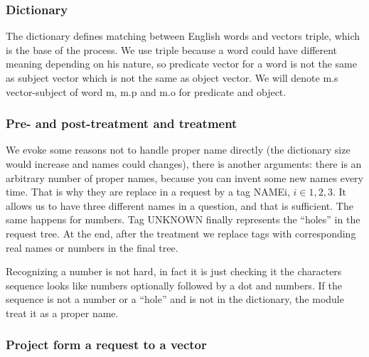 

\subsubsection{Dictionary}

The dictionary defines matching between English words and vectors triple, which is the base of the process. We use triple because a word could have different meaning depending on his nature, so predicate vector for a word is not the same as subject vector which is not the same as object vector. We will denote m.s vector-subject of word m, m.p and m.o for predicate and object.

\subsubsection{Pre- and post-treatment and treatment}

We evoke some reasons not to handle proper name directly (the dictionary size would increase and names could changes), there is another arguments: there is an arbitrary number of proper names, because you can invent some new names every time. That is why they are replace in a request by a tag NAMEi, $i\in{1,2,3}$. It allows us to have three different names in a question, and that is sufficient. The same happens for numbers. Tag UNKNOWN finally represents the ``holes'' in the request tree. At the end, after the treatment we replace tags with corresponding real names or numbers in the final tree.

Recognizing a number is not hard, in fact it is just checking it the characters sequence looks like numbers optionally followed by a dot and numbers. If the sequence is not a number or a ``hole'' and is not in the dictionary, the module treat it as a proper name.

\subsubsection{Project form a request to a vector}

